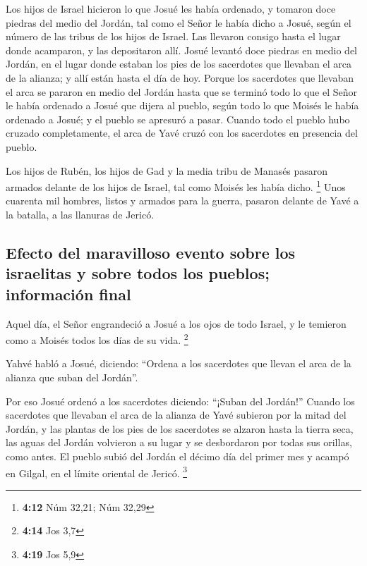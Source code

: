  Los hijos de Israel hicieron lo que Josué les había
ordenado, y tomaron doce piedras del medio del Jordán, tal como el Señor
le había dicho a Josué, según el número de las tribus de los hijos de
Israel. Las llevaron consigo hasta el lugar donde acamparon, y las
depositaron allí.  Josué levantó doce piedras en medio del
Jordán, en el lugar donde estaban los pies de los sacerdotes que
llevaban el arca de la alianza; y allí están hasta el día de hoy.
 Porque los sacerdotes que llevaban el arca se pararon en
medio del Jordán hasta que se terminó todo lo que el Señor le había
ordenado a Josué que dijera al pueblo, según todo lo que Moisés le había
ordenado a Josué; y el pueblo se apresuró a pasar. 
Cuando todo el pueblo hubo cruzado completamente, el arca de Yavé cruzó
con los sacerdotes en presencia del pueblo.

 Los hijos de Rubén, los hijos de Gad y la media tribu de
Manasés pasaron armados delante de los hijos de Israel, tal como Moisés
les había dicho. \footnote{\textbf{4:12} Núm 32,21; Núm 32,29}
 Unos cuarenta mil hombres, listos y armados para la
guerra, pasaron delante de Yavé a la batalla, a las llanuras de Jericó.

\hypertarget{efecto-del-maravilloso-evento-sobre-los-israelitas-y-sobre-todos-los-pueblos-informaciuxf3n-final}{%
\subsection{Efecto del maravilloso evento sobre los israelitas y sobre
todos los pueblos; información
final}\label{efecto-del-maravilloso-evento-sobre-los-israelitas-y-sobre-todos-los-pueblos-informaciuxf3n-final}}

 Aquel día, el Señor engrandeció a Josué a los ojos de
todo Israel, y le temieron como a Moisés todos los días de su vida.
\footnote{\textbf{4:14} Jos 3,7}

 Yahvé habló a Josué, diciendo:  ``Ordena
a los sacerdotes que llevan el arca de la alianza que suban del
Jordán''.

 Por eso Josué ordenó a los sacerdotes diciendo: ``¡Suban
del Jordán!''  Cuando los sacerdotes que llevaban el arca
de la alianza de Yavé subieron por la mitad del Jordán, y las plantas de
los pies de los sacerdotes se alzaron hasta la tierra seca, las aguas
del Jordán volvieron a su lugar y se desbordaron por todas sus orillas,
como antes.  El pueblo subió del Jordán el décimo día del
primer mes y acampó en Gilgal, en el límite oriental de Jericó.
\footnote{\textbf{4:19} Jos 5,9}

